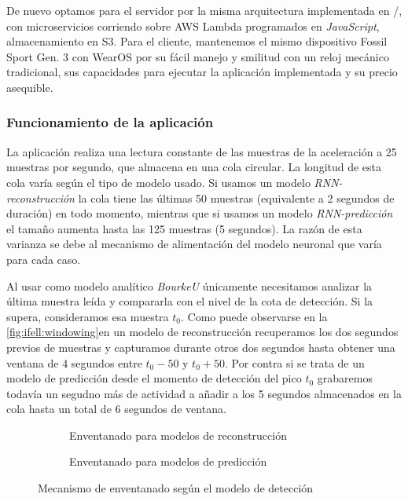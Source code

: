 De nuevo optamos para el servidor por la misma arquitectura implementada en \accelcapture/, con microservicios corriendo sobre AWS Lambda programados en \textit{JavaScript}, almacenamiento en S3. Para el cliente, mantenemos el mismo dispositivo Fossil Sport Gen. 3 con WearOS por su fácil manejo y smilitud con un reloj mecánico tradicional, sus capacidades para ejecutar la aplicación implementada y su precio asequible.

\subsubsection{Funcionamiento de la aplicación}\label{subsub:ifell:windowing}
La aplicación realiza una lectura constante de las muestras de la aceleración a 25 muestras por segundo, que almacena en una cola circular. La longitud de esta cola varía según el tipo de modelo usado. Si usamos un modelo \textit{RNN-reconstrucción} la cola tiene las últimas 50 muestras (equivalente a 2 segundos de duración) en todo momento, mientras que si usamos un modelo \textit{RNN-predicción} el tamaño aumenta hasta las 125 muestras (5 segundos). La razón de esta varianza se debe al mecanismo de alimentación del modelo neuronal que varía para cada caso.

Al usar como modelo analítico \textit{BourkeU} únicamente necesitamos analizar la última muestra leída y compararla con el nivel de la cota de detección. Si la supera, consideramos esa muestra $t_0$. Como puede observarse en la \autoref{fig:ifell:windowing}en un modelo de reconstrucción recuperamos los dos segundos previos de muestras y capturamos durante otros dos segundos hasta obtener una ventana de 4 segundos entre $t_0-50$ y $t_0+50$. Por contra si se trata de un modelo de predicción desde el momento de detección del pico $t_0$ grabaremos todavía un segudno más de actividad a añadir a los 5 segundos almacenados en la cola hasta un total de 6 segundos de ventana.  

\begin{figure}[hbt!]
  \centering
  \begin{subfigure}[b]{0.48\textwidth}
    \caption{\footnotesize \label{fig:ifell:detect:window} Enventanado para modelos de reconstrucción}
  \end{subfigure}
  \hfill
  \begin{subfigure}[b]{0.48\textwidth}
    \caption{\footnotesize \label{fig:ifell:predict:window} Enventanado para modelos de predicción}
  \end{subfigure}
  \caption{\footnotesize \label{fig:ifell:windowing} Mecanismo de enventanado según el modelo de detección}
\end{figure}

